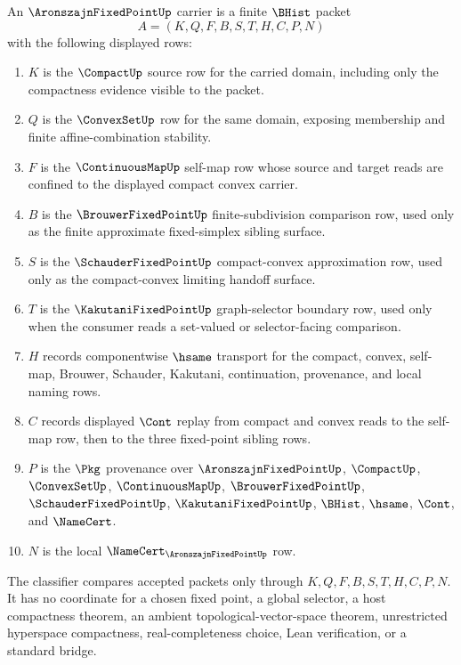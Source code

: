 \begin{definition}
\label{def:aronszajn-fixed-point-carrier}
An $\AronszajnFixedPointUp$ carrier is a finite $\BHist$ packet
$$
A=(K,Q,F,B,S,T,H,C,P,N)
$$
with the following displayed rows:
\begin{enumerate}
\item $K$ is the $\CompactUp$ source row for the carried domain, including only the compactness evidence visible to the packet.
\item $Q$ is the $\ConvexSetUp$ row for the same domain, exposing membership and finite affine-combination stability.
\item $F$ is the $\ContinuousMapUp$ self-map row whose source and target reads are confined to the displayed compact convex carrier.
\item $B$ is the $\BrouwerFixedPointUp$ finite-subdivision comparison row, used only as the finite approximate fixed-simplex sibling surface.
\item $S$ is the $\SchauderFixedPointUp$ compact-convex approximation row, used only as the compact-convex limiting handoff surface.
\item $T$ is the $\KakutaniFixedPointUp$ graph-selector boundary row, used only when the consumer reads a set-valued or selector-facing comparison.
\item $H$ records componentwise $\hsame$ transport for the compact, convex, self-map, Brouwer, Schauder, Kakutani, continuation, provenance, and local naming rows.
\item $C$ records displayed $\Cont$ replay from compact and convex reads to the self-map row, then to the three fixed-point sibling rows.
\item $P$ is the $\Pkg$ provenance over $\AronszajnFixedPointUp$, $\CompactUp$, $\ConvexSetUp$, $\ContinuousMapUp$, $\BrouwerFixedPointUp$, $\SchauderFixedPointUp$, $\KakutaniFixedPointUp$, $\BHist$, $\hsame$, $\Cont$, and $\NameCert$.
\item $N$ is the local $\NameCert_{\AronszajnFixedPointUp}$ row.
\end{enumerate}
The classifier compares accepted packets only through $K,Q,F,B,S,T,H,C,P,N$. It has no coordinate for a chosen fixed point, a global selector, a host compactness theorem, an ambient topological-vector-space theorem, unrestricted hyperspace compactness, real-completeness choice, Lean verification, or a standard bridge.
\end{definition}

